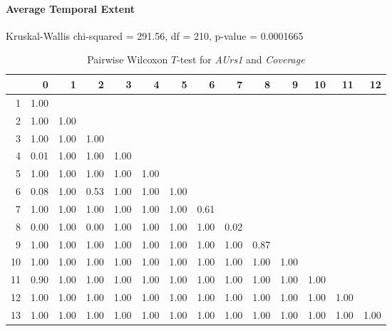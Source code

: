 \paragraph{Average Temporal Extent}
Kruskal-Wallis chi-squared = 291.56, df = 210, p-value = 0.0001665

\begin{table}[ht]
	\small
	\centering
	\begin{tabular}{rrrrrrrrrrrrrr}
		\hline
	   & 0 & 1 & 2 & 3 & 4 & 5 & 6 & 7 & 8 & 9 & 10 & 11 & 12 \\ 
		\hline
	  1 & 1.00 &  &  &  &  &  &  &  &  &  &  &  &  \\ 
		2 & 1.00 & 1.00 &  &  &  &  &  &  &  &  &  &  &  \\ 
		3 & 1.00 & 1.00 & 1.00 &  &  &  &  &  &  &  &  &  &  \\ 
		4 & 0.01 & 1.00 & 1.00 & 1.00 &  &  &  &  &  &  &  &  &  \\ 
		5 & 1.00 & 1.00 & 1.00 & 1.00 & 1.00 &  &  &  &  &  &  &  &  \\ 
		6 & 0.08 & 1.00 & 0.53 & 1.00 & 1.00 & 1.00 &  &  &  &  &  &  &  \\ 
		7 & 1.00 & 1.00 & 1.00 & 1.00 & 1.00 & 1.00 & 0.61 &  &  &  &  &  &  \\ 
		8 & 0.00 & 1.00 & 0.00 & 1.00 & 1.00 & 1.00 & 1.00 & 0.02 &  &  &  &  &  \\ 
		9 & 1.00 & 1.00 & 1.00 & 1.00 & 1.00 & 1.00 & 1.00 & 1.00 & 0.87 &  &  &  &  \\ 
		10 & 1.00 & 1.00 & 1.00 & 1.00 & 1.00 & 1.00 & 1.00 & 1.00 & 1.00 & 1.00 &  &  &  \\ 
		11 & 0.90 & 1.00 & 1.00 & 1.00 & 1.00 & 1.00 & 1.00 & 1.00 & 1.00 & 1.00 & 1.00 &  &  \\ 
		12 & 1.00 & 1.00 & 1.00 & 1.00 & 1.00 & 1.00 & 1.00 & 1.00 & 1.00 & 1.00 & 1.00 & 1.00 &  \\ 
		13 & 1.00 & 1.00 & 1.00 & 1.00 & 1.00 & 1.00 & 1.00 & 1.00 & 1.00 & 1.00 & 1.00 & 1.00 & 1.00 \\ 
		 \hline
	  \end{tabular}
    \caption{Pairwise Wilcoxon $T$-test for \textit{AUrs1} and \textit{Coverage}}
    \label{tbl:wilcoxon_baysis_effector_AUrs1_Cov}
\end{table}
